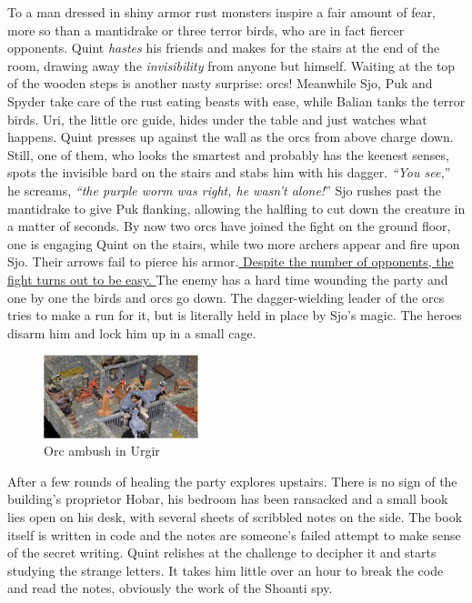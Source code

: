 To a man dressed in shiny armor rust monsters inspire a fair amount of fear, more so than a mantidrake or three terror birds, who are in fact fiercer opponents. Quint {\itshape hastes} his friends and makes for the stairs at the end of the room, drawing away the  {\itshape invisibility} from anyone but himself. Waiting at the top of the wooden steps is another nasty surprise: orcs! Meanwhile Sjo, Puk and Spyder take care of the rust eating beasts with ease, while Balian tanks the terror birds. Uri, the little orc guide, hides under the table and just watches what happens. Quint presses up against the wall as the orcs from above charge down. Still, one of them, who looks the smartest and probably has the keenest senses, spots the invisible bard on the stairs and stabs him with his dagger. {\itshape``You see,}'' he screams, {\itshape``the purple worm was right, he wasn't alone!}'' Sjo rushes past the mantidrake to give Puk flanking, allowing the halfling to cut down the creature in a matter of seconds. By now two orcs have joined the fight on the ground floor, one is engaging Quint on the stairs, while two more archers appear and fire upon Sjo. Their arrows fail to pierce his armor.\hyperref[fig:Orc-ambush-in-Urgir-593345070]{ Despite the number of opponents, the fight turns out to be easy. } The enemy has a hard time wounding the party and one by one the birds and orcs go down. The dagger-wielding leader of the orcs tries to make a run for it, but is literally held  in place by Sjo's magic. The heroes disarm him and lock him up in a small cage. \\

\begin{figure}[h]
	\centering
	\includegraphics[width=0.4\textwidth]{images/Orc-ambush-in-Urgir-593345070_mod.jpg}
	\caption{Orc ambush in Urgir}
	\label{fig:Orc-ambush-in-Urgir-593345070}
\end{figure}

After a few rounds of healing the party explores upstairs. There is no sign of the building's proprietor Hobar, his bedroom has been ransacked and a small book lies open on his desk, with several sheets of scribbled notes on the side. The book itself is written in code and the notes are someone's failed attempt to make sense of the secret writing. Quint relishes at the challenge to decipher it and starts studying the strange letters. It takes him little over an hour to break the code and read the notes, obviously the work of the Shoanti spy.\\

